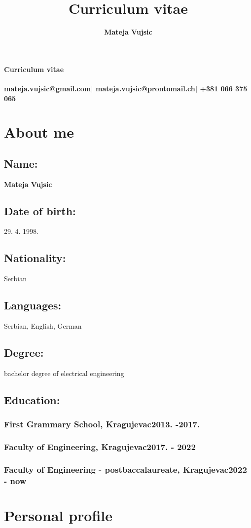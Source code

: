 \documentclass[10pt]{article}
\title{Curriculum vitae}
\author{\textbf{Mateja Vujsic}}
\makeatletter
\renewcommand{\maketitle}{
	\begin{center}
	{\Large\textbf{Curriculum vitae}}\\
	\vspace{.62em}
	{\huge\bfseries\theauthor}\\
	\vspace{.62em}
	{\bfseries{mateja.vujsic@gmail.com| mateja.vujsic@prontomail.ch| +381 066 375 065}}
	\end{center}
}
\makeatother
\begin{document}
\maketitle

\section{About me}
\subsection{\large{Name:}}
\textbf{\large{Mateja Vujsic}}
\subsection{\large{Date of birth:}}
\large{29. 4. 1998.}
\subsection{\large{Nationality:}}
\large{Serbian}
\subsection{\large{Languages:}}
\large{Serbian, English, German}
\subsection{\large{Degree:}}
\large{bachelor degree of electrical engineering}
\subsection{\large{Education:}}
\subsubsection{First Grammary School, Kragujevac\hfill 2013. -2017.}
\subsubsection{Faculty of Engineering, Kragujevac\hfill 2017. - 2022 }
\subsubsection{Faculty of Engineering - postbaccalaureate, Kragujevac\hfill 2022 - now }


\section{Personal profile}
\end{document}
